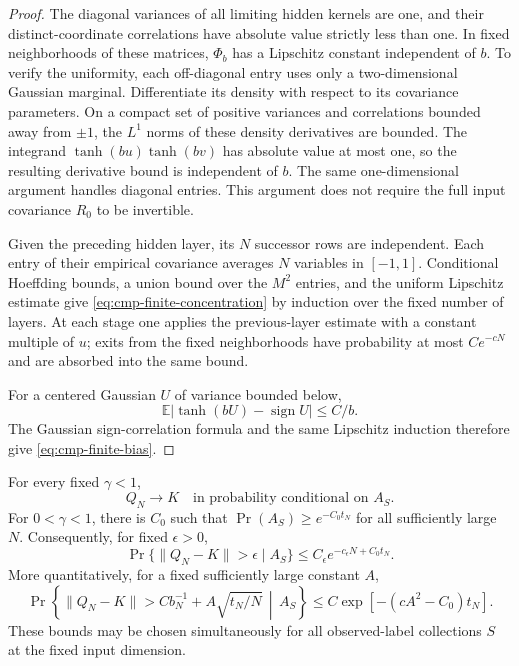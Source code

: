 \begin{proof}
The diagonal variances of all limiting hidden kernels are one, and
their distinct-coordinate correlations have absolute value strictly
less than one. In fixed neighborhoods of these matrices, $\Phi_b$ has
a Lipschitz constant independent of $b$. To verify the uniformity, each
off-diagonal entry uses only a two-dimensional Gaussian marginal.
Differentiate its density with respect to its covariance parameters.
On a compact set of positive variances and correlations bounded away
from $\pm1$, the $L^1$ norms of these density derivatives are bounded.
The integrand $\tanh(bu)\tanh(bv)$ has absolute value at most one,
so the resulting derivative bound is independent of $b$. The same
one-dimensional argument handles diagonal entries. This argument does
not require the full input covariance $R_0$ to be invertible.

Given the preceding hidden layer, its $N$ successor rows are independent.
Each entry of their empirical covariance averages $N$ variables in
$[-1,1]$. Conditional Hoeffding bounds, a union bound over the $M^2$
entries, and the uniform Lipschitz estimate give
\eqref{eq:cmp-finite-concentration} by induction over the fixed number
of layers. At each stage one applies the previous-layer estimate with
a constant multiple of $u$; exits from the fixed neighborhoods have
probability at most $C e^{-cN}$ and are absorbed into the same bound.

For a centered Gaussian $U$ of variance bounded below,
\[
 \mathbb E|\tanh(bU)-\operatorname{sign}U|\le C/b.
\]
The Gaussian sign-correlation formula and the same Lipschitz induction
therefore give \eqref{eq:cmp-finite-bias}.
\end{proof}

\begin{proposition}
\label{prop:cmp-conditional-freezing}
For every fixed $\gamma<1$,
\[
 Q_N\longrightarrow K
 \quad\text{in probability conditional on }A_S.
\]
For $0<\gamma<1$, there is $C_0$ such that
$\Pr(A_S)\ge e^{-C_0t_N}$ for all sufficiently large $N$.
Consequently, for fixed $\epsilon>0$,
\[
 \Pr\{\|Q_N-K\|>\epsilon\mid A_S\}
 \le C_\epsilon e^{-c_\epsilon N+C_0t_N}.
\]
More quantitatively, for a fixed sufficiently large constant $A$,
\[
 \Pr\left\{\|Q_N-K\|>
 C b_N^{-1}+A\sqrt{t_N/N}\,\middle|\,A_S\right\}
 \le C\exp[-(cA^2-C_0)t_N].
\]
These bounds may be chosen simultaneously for all observed-label
collections $S$ at the fixed input dimension.
\end{proposition}


